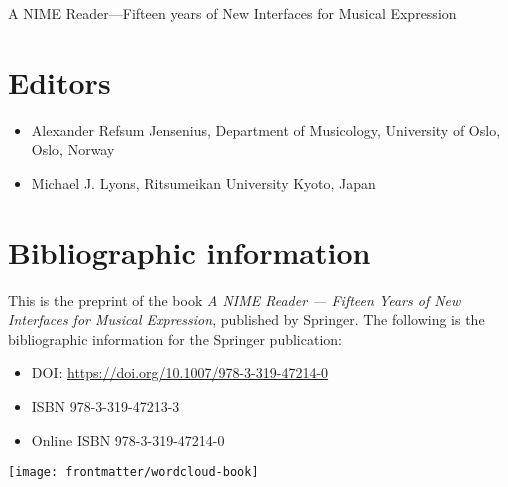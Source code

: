 %
%
%



\begin{dedication}
A NIME Reader---Fifteen years of New Interfaces for Musical Expression
\end{dedication}

\newpage

\section{Editors} %


\begin{itemize}
	\item Alexander Refsum Jensenius, Department of Musicology, University of Oslo, Oslo, Norway
	\item Michael J. Lyons, Ritsumeikan University Kyoto, Japan
\end{itemize}



\section{Bibliographic information}

This is the preprint of the book \textit{A NIME Reader --- Fifteen Years of New Interfaces for Musical Expression}, published by Springer. The following is the bibliographic information for the Springer publication: 


\begin{itemize}
	\item DOI: \url{https://doi.org/10.1007/978-3-319-47214-0}
	\item ISBN 978-3-319-47213-3 
   	\item Online ISBN 978-3-319-47214-0 
\end{itemize}


\newpage


\begin{figure*}[t]
\centering
\texttt{[image: frontmatter/wordcloud-book]}
\caption{}
\end{figure*}
